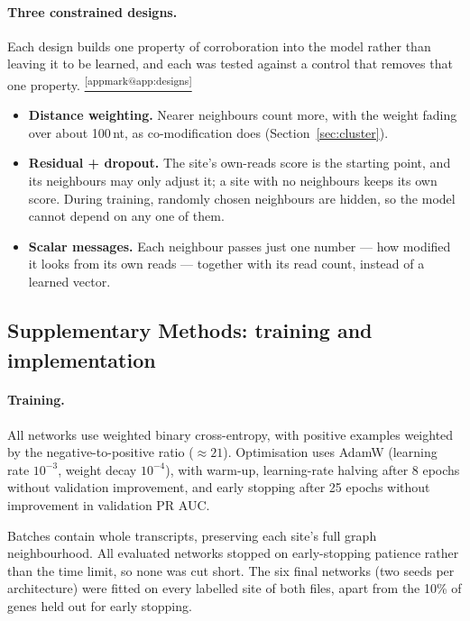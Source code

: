 \documentclass[11pt,a4paper]{article}
\makeatletter
\newcounter{appmarknum}
\DeclareRobustCommand{\appmark}[1]{%
    \refstepcounter{appmarknum}\label{appmark@#1}%
    \textsuperscript{\arabic{appmarknum}}}
\DeclareRobustCommand{\applink}[1]{%
    \hyperref[#1]{\textsuperscript{\ref*{appmark@#1}}}}
\makeatother
\begin{document}
\paragraph{Three constrained designs.}
Each design builds one property of corroboration into the model rather than leaving it to be learned, and each was tested against a control that removes that one property.\applink{app:designs}
\begin{itemize}
    \item \textbf{Distance weighting.} Nearer neighbours count more, with the weight fading over about 100\,nt, as co-modification does (Section~\ref{sec:cluster}).
    \item \textbf{Residual + dropout.} The site's own-reads score is the starting point, and its neighbours may only adjust it; a site with no neighbours keeps its own score. During training, randomly chosen neighbours are hidden, so the model cannot depend on any one of them.
    \item \textbf{Scalar messages.} Each neighbour passes just one number --- how modified it looks from its own reads --- together with its read count, instead of a learned vector.
\end{itemize}

\subsection*{Supplementary Methods: training and implementation\texorpdfstring{\appmark{app:training-details}}{}}
\label{app:training-details}
\paragraph{Training.} All networks use weighted binary cross-entropy, with
positive examples weighted by the negative-to-positive ratio ($\approx 21$).
Optimisation uses AdamW (learning rate $10^{-3}$, weight decay $10^{-4}$),
with warm-up, learning-rate halving after 8 epochs without validation
improvement, and early stopping after 25 epochs without improvement in
validation PR AUC.

Batches contain whole transcripts, preserving each site's full graph
neighbourhood. All evaluated networks stopped on early-stopping patience
rather than the time limit, so none was cut short. The six final networks
(two seeds per architecture) were fitted on every labelled site of both
files, apart from the 10\% of genes held out for early stopping.
\end{document}
